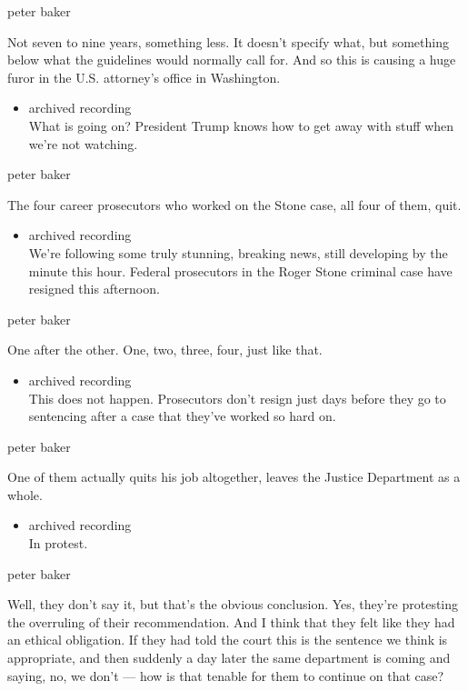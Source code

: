 peter baker

Not seven to nine years, something less. It doesn't specify what, but
something below what the guidelines would normally call for. And so this
is causing a huge furor in the U.S. attorney's office in Washington.

\begin{itemize}
\tightlist
\item
  archived recording\\
  What is going on? President Trump knows how to get away with stuff
  when we're not watching.
\end{itemize}

peter baker

The four career prosecutors who worked on the Stone case, all four of
them, quit.

\begin{itemize}
\tightlist
\item
  archived recording\\
  We're following some truly stunning, breaking news, still developing
  by the minute this hour. Federal prosecutors in the Roger Stone
  criminal case have resigned this afternoon.
\end{itemize}

peter baker

One after the other. One, two, three, four, just like that.

\begin{itemize}
\tightlist
\item
  archived recording\\
  This does not happen. Prosecutors don't resign just days before they
  go to sentencing after a case that they've worked so hard on.
\end{itemize}

peter baker

One of them actually quits his job altogether, leaves the Justice
Department as a whole.

\begin{itemize}
\tightlist
\item
  archived recording\\
  In protest.
\end{itemize}

peter baker

Well, they don't say it, but that's the obvious conclusion. Yes, they're
protesting the overruling of their recommendation. And I think that they
felt like they had an ethical obligation. If they had told the court
this is the sentence we think is appropriate, and then suddenly a day
later the same department is coming and saying, no, we don't --- how is
that tenable for them to continue on that case?

